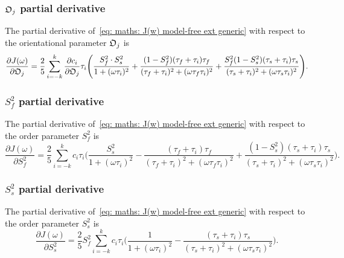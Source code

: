 \subsubsection{$\mathfrak{O}_j$ partial derivative}

The partial derivative of~\eqref{eq: maths: J(w) model-free ext generic} with respect to the orientational parameter $\mathfrak{O}_j$ is
\begin{equation}
    \frac{\partial J(\omega)}{\partial \mathfrak{O}_j} = \frac{2}{5} \sum_{i=-k}^k \frac{\partial c_i}{\partial \mathfrak{O}_j} \tau_i \Bigg(
        \frac{S^2_f \cdot S^2_s}{1 + (\omega \tau_i)^2}
        + \frac{(1 - S^2_f)(\tau_f + \tau_i)\tau_f}{(\tau_f + \tau_i)^2 + (\omega \tau_f \tau_i)^2}
        + \frac{S^2_f(1 - S^2_s)(\tau_s + \tau_i)\tau_s}{(\tau_s + \tau_i)^2 + (\omega \tau_s \tau_i)^2}
    \Bigg).
\end{equation}



\subsubsection{$S^2_f$ partial derivative}

The partial derivative of~\eqref{eq: maths: J(w) model-free ext generic} with respect to the order parameter $S^2_f$ is
\begin{equation}
    \frac{\partial J(\omega)}{\partial S^2_f} = \frac{2}{5} \sum_{i=-k}^k c_i \tau_i \Bigg(
        \frac{S^2_s}{1 + (\omega \tau_i)^2}
        - \frac{(\tau_f + \tau_i)\tau_f}{(\tau_f + \tau_i)^2 + (\omega \tau_f \tau_i)^2}
        + \frac{(1 - S^2_s) (\tau_s + \tau_i)\tau_s}{(\tau_s + \tau_i)^2 + (\omega \tau_s \tau_i)^2}
    \Bigg).
\end{equation}



\subsubsection{$S^2_s$ partial derivative}

The partial derivative of~\eqref{eq: maths: J(w) model-free ext generic} with respect to the order parameter $S^2_s$ is
\begin{equation}
    \frac{\partial J(\omega)}{\partial S^2_s} = \frac{2}{5} S^2_f \sum_{i=-k}^k c_i \tau_i \Bigg(
        \frac{1}{1 + (\omega \tau_i)^2}
        - \frac{(\tau_s + \tau_i)\tau_s}{(\tau_s + \tau_i)^2 + (\omega \tau_s \tau_i)^2}
    \Bigg).
\end{equation}



